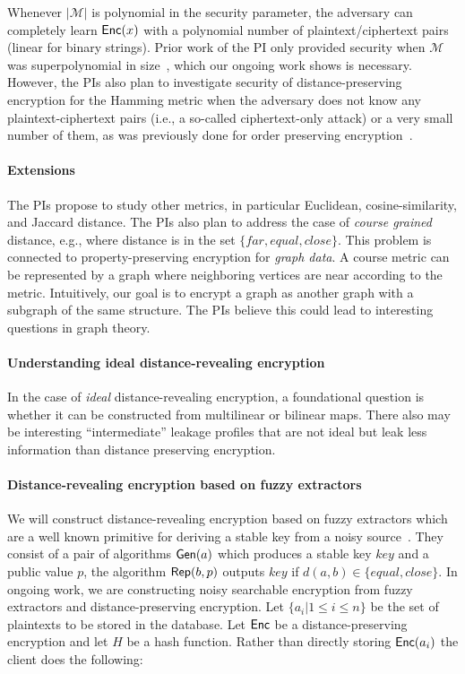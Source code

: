 Whenever $|\mathcal{M}|$ is polynomial in the security parameter, the adversary can completely learn $\mathsf{Enc}(x)$ with a polynomial number of plaintext/ciphertext pairs (linear for binary strings).  Prior work of the PI only provided security when $\mathcal{M}$ was superpolynomial in size~\cite{EPRINT:ABCFG16}, which our ongoing work shows is necessary.  However, the PIs also plan to investigate security of distance-preserving encryption for the Hamming metric when the adversary does not know any plaintext-ciphertext pairs (i.e., a so-called ciphertext-only attack) or a very small number of them, as was previously done for order preserving encryption~\cite{C:BolCheONe11}.
 
 \paragraph{Extensions} The PIs propose to study other metrics, in particular Euclidean, cosine-similarity, and Jaccard distance.    The PIs also plan to address the case of \emph{course grained} distance, e.g., where distance is in the set $\{far, equal, close\}$.  This problem is connected to property-preserving encryption for \emph{graph data}.  A course metric can be represented by a graph where neighboring vertices are near according to the metric.  Intuitively, our goal is to encrypt a graph as another graph with a subgraph of the same structure. The PIs believe this could lead to interesting questions in graph theory.

\paragraph{Understanding ideal distance-revealing encryption}
In the case of \emph{ideal} distance-revealing encryption, a foundational question is whether it can be constructed from multilinear or bilinear maps.  There also may be interesting ``intermediate'' leakage profiles that are not ideal but leak less information than distance preserving encryption. 

\paragraph{Distance-revealing encryption based on fuzzy extractors}
We will construct distance-revealing encryption based on fuzzy extractors which are a well known primitive for deriving a stable key from a noisy source~\cite{EC:DodReySmi04}.  They consist of a pair of algorithms $\mathsf{Gen}(a)$ which produces a stable key $key$ and a public value $p$, the algorithm $\mathsf{Rep}(b, p)$ outputs $key$ if $d(a,b)\in\{equal,close\}$.  In ongoing work, we are constructing noisy searchable encryption from fuzzy extractors and distance-preserving encryption.  Let $\{a_i | 1\le i \le n\}$ be the set of plaintexts to be stored in the database.  Let $\mathsf{Enc}$ be a distance-preserving encryption and let $H$ be a hash function.  Rather than directly storing $\mathsf{Enc}(a_i)$ the client does the following:


